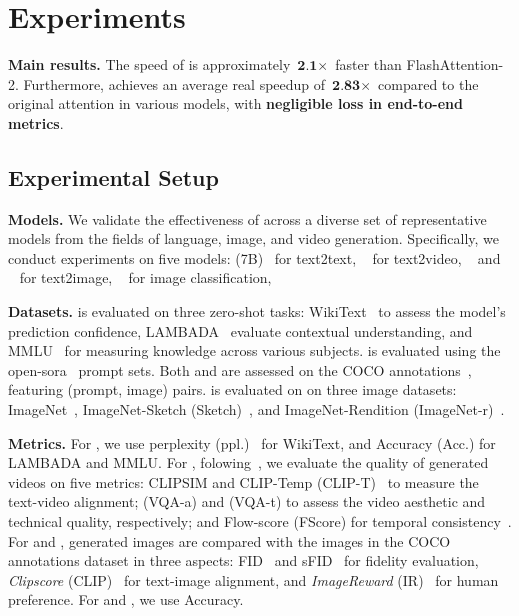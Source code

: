 
\section{Experiments}

\noindent \textbf{Main results.} The speed of \our is approximately $\textbf{2.1}\times$ faster than FlashAttention-2. Furthermore, \our achieves an average real speedup of $\textbf{2.83}\times$ compared to the original attention in various models, with \textbf{negligible loss in end-to-end metrics}.

\subsection{Experimental Setup} \label{sec:exp_set_up}

\noindent \textbf{Models.} 
%
We validate the effectiveness of \our across a diverse set of representative models from the fields of language, image, and video generation.
Specifically, we conduct experiments on five models: \llama(7B)~\citep{touvron2023llama2} for text2text, \cogvideo~\citep{yang2024cogvideox} for text2video, \unidiffuser~\citep{bao2022uni} and \ultrapixel~\citep{ren2024ultrapixel} for text2image, \timm~\citep{rw2019timm} for image classification, 

\noindent \textbf{Datasets.}   
\llama is evaluated on three zero-shot tasks: WikiText~\citep{merity2022pointer} to assess the model's prediction confidence, LAMBADA~\citep{paperno2016lambada} evaluate contextual understanding, and MMLU~\citep{2020mmlu} for measuring knowledge across various subjects.
\cogvideo is evaluated using the open-sora~\citep{opensora} prompt sets.
Both \ultrapixel and \unidiffuser are assessed on the COCO annotations~\citep{lin2014microsoft}, featuring (prompt, image) pairs.
\timm is evaluated on on three image datasets: ImageNet~\citep{deng2009imagenet}, ImageNet-Sketch (Sketch)~\citep{wang2019sketch}, and ImageNet-Rendition (ImageNet-r)~\citep{hendrycks2021rendition}. 


\noindent \textbf{Metrics.}   
For \llama, we use perplexity (ppl.)~\citep{jelinek1977perplexity} for WikiText, and Accuracy (Acc.) for LAMBADA and MMLU.
For \cogvideo, folowing~\citep{zhao2024vidit}, we evaluate the quality of generated videos on five metrics: CLIPSIM and CLIP-Temp (CLIP-T)~\citep{liu2024evalcrafter} to measure the text-video alignment; (VQA-a) and (VQA-t) to assess the video aesthetic and technical quality, respectively; and Flow-score (FScore) for temporal consistency~\citep{wu2023exploring}. 
For \ultrapixel and \unidiffuser, generated images are compared with the images in the COCO annotations dataset in three aspects: FID~\citep{heusel2017gans} and sFID~\citep{salimans2016improved} for fidelity evaluation, \textit{Clipscore} (CLIP)~\citep{hessel2021clipscore} for text-image alignment, and \textit{ImageReward} (IR)~\citep{xu2024imagereward} for human preference.
For \timm and \llava, we use Accuracy.



